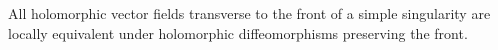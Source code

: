 All holomorphic vector fields transverse to the front of a simple singularity are locally equivalent under holomorphic diffeomorphisms preserving the front.
